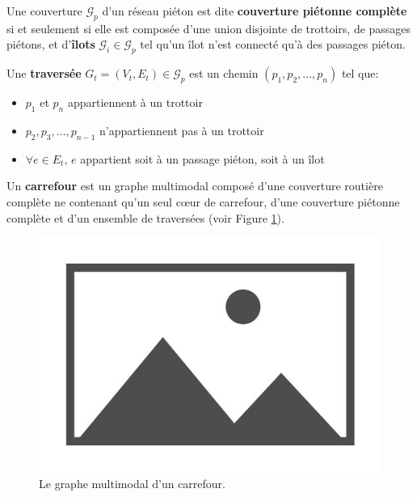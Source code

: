 \begin{definition}
    Une couverture $\mathcal{G}_p$ d'un réseau piéton est dite \textbf{couverture piétonne complète} si et seulement si elle est composée d'une union disjointe de trottoirs, de passages piétons, et d'\textbf{îlots} $\mathcal{G}_i \in \mathcal{G}_p$ tel qu'un îlot n'est connecté qu'à des passages piéton.
\end{definition}

\begin{definition}
    Une \textbf{traversée} $G_{t} = (V_{t}, E_{t}) \in \mathcal{G}_p$ est un chemin $(p_1, p_2,\dots, p_n)$ tel que:

    \begin{itemize}
        \item $p_1$ et $p_n$ appartiennent à un trottoir
        \item $p_2, p_3, \dots, p_{n-1}$ n'appartiennent pas à un trottoir
        \item $\forall e \in E_t$, $e$ appartient soit à un passage piéton, soit à un îlot
    \end{itemize}
\end{definition}

\begin{definition}
    Un \textbf{carrefour} est un graphe multimodal composé d'une couverture routière complète ne contenant qu'un seul cœur de carrefour, d'une couverture piétonne complète et d'un ensemble de traversées (voir Figure \ref{fig:mod_ex_graphe_carrefour}).
\end{definition}

\begin{figure}
    \centering
    \includegraphics{images/placeholder.jpg}
    \caption{Le graphe multimodal d'un carrefour.}
    \label{fig:mod_ex_graphe_carrefour}
\end{figure}

